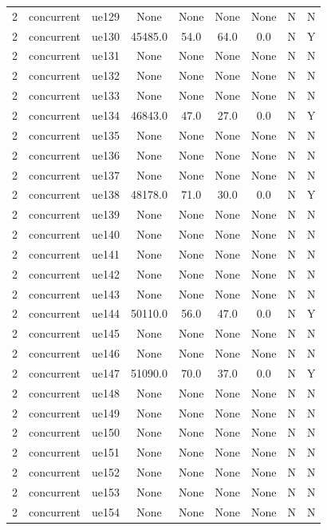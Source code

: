 \begin{table}[ht]
\begin{tabular}{|c|c|c|c|c|c|c|c|c|}
2 & concurrent & ue129 & None & None & None & None & N & N \\
2 & concurrent & ue130 & 45485.0 & 54.0 & 64.0 & 0.0 & N & Y \\
2 & concurrent & ue131 & None & None & None & None & N & N \\
2 & concurrent & ue132 & None & None & None & None & N & N \\
2 & concurrent & ue133 & None & None & None & None & N & N \\
2 & concurrent & ue134 & 46843.0 & 47.0 & 27.0 & 0.0 & N & Y \\
2 & concurrent & ue135 & None & None & None & None & N & N \\
2 & concurrent & ue136 & None & None & None & None & N & N \\
2 & concurrent & ue137 & None & None & None & None & N & N \\
2 & concurrent & ue138 & 48178.0 & 71.0 & 30.0 & 0.0 & N & Y \\
2 & concurrent & ue139 & None & None & None & None & N & N \\
2 & concurrent & ue140 & None & None & None & None & N & N \\
2 & concurrent & ue141 & None & None & None & None & N & N \\
2 & concurrent & ue142 & None & None & None & None & N & N \\
2 & concurrent & ue143 & None & None & None & None & N & N \\
2 & concurrent & ue144 & 50110.0 & 56.0 & 47.0 & 0.0 & N & Y \\
2 & concurrent & ue145 & None & None & None & None & N & N \\
2 & concurrent & ue146 & None & None & None & None & N & N \\
2 & concurrent & ue147 & 51090.0 & 70.0 & 37.0 & 0.0 & N & Y \\
2 & concurrent & ue148 & None & None & None & None & N & N \\
2 & concurrent & ue149 & None & None & None & None & N & N \\
2 & concurrent & ue150 & None & None & None & None & N & N \\
2 & concurrent & ue151 & None & None & None & None & N & N \\
2 & concurrent & ue152 & None & None & None & None & N & N \\
2 & concurrent & ue153 & None & None & None & None & N & N \\
2 & concurrent & ue154 & None & None & None & None & N & N \\

\end{tabular}
\end{table}
